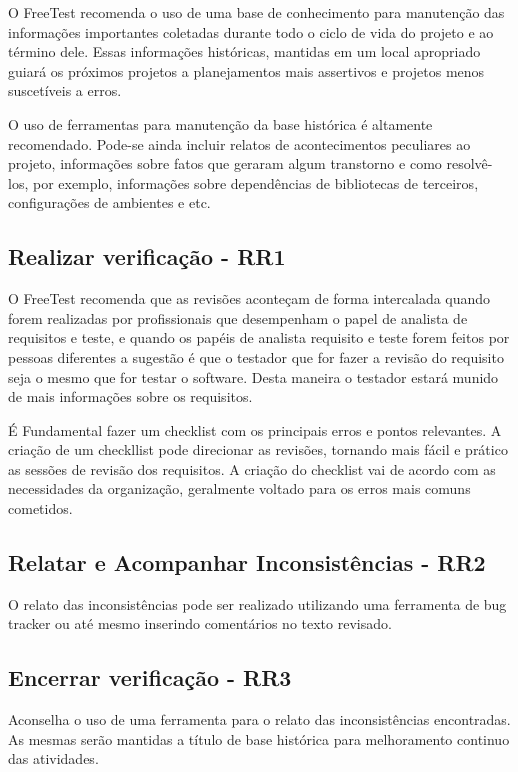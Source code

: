 O FreeTest recomenda o uso de uma base de conhecimento para manutenção das informações importantes coletadas durante todo o ciclo de vida do projeto e ao término dele. Essas informações históricas, mantidas em um local apropriado guiará os próximos projetos a planejamentos mais assertivos e projetos menos suscetíveis a erros.

O uso de ferramentas para manutenção da base histórica é altamente recomendado. Pode-se ainda incluir relatos de acontecimentos peculiares ao projeto, informações sobre fatos que geraram algum transtorno e como resolvê-los, por exemplo, informações sobre dependências de bibliotecas de terceiros, configurações de ambientes e etc.

\subsection{Realizar verificação - RR1}
\label{sec:guiarr1}

O FreeTest recomenda que as revisões aconteçam de forma intercalada quando forem realizadas por profissionais que desempenham o papel de analista de requisitos e teste, e quando os papéis de analista requisito e teste forem feitos por pessoas diferentes a sugestão é que o testador que for fazer a revisão do requisito seja o mesmo que for testar o software. Desta maneira o testador estará munido de mais informações sobre os requisitos.

É Fundamental fazer um checklist com os principais erros e pontos relevantes. A criação de um checkllist pode direcionar as revisões, tornando mais fácil e prático as sessões de revisão dos requisitos. A criação do checklist vai de acordo com as necessidades da organização, geralmente voltado para os erros mais comuns cometidos.

\subsection{Relatar e Acompanhar Inconsistências - RR2}
\label{sec:guiarr2}

O relato das inconsistências pode ser realizado utilizando uma ferramenta de bug tracker ou até mesmo inserindo comentários no texto revisado.

\subsection{Encerrar verificação - RR3}
\label{sec:guiarr3}

Aconselha o uso de uma ferramenta para o relato das inconsistências encontradas. As mesmas serão mantidas a título de base histórica para melhoramento continuo das atividades.

